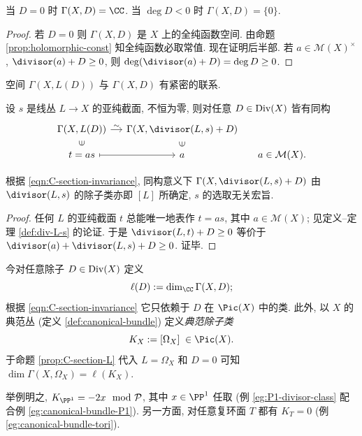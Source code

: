 \begin{lemma}\label{prop:low-degree-vanishing}
	当 $D=0$ 时 $\Gamma(X,D) = \CC$. 当 $\deg D < 0$ 时 $\Gamma(X,D) = \{0\}$.
\end{lemma}
\begin{proof}
	若 $D=0$ 则 $\Gamma(X,D)$ 是 $X$ 上的全纯函数空间. 由命题 \ref{prop:holomorphic-const} 知全纯函数必取常值.	现在证明后半部. 若 $a \in \mathcal{M}(X)^\times$, $\divisor(a) + D \geq 0$, 则 $\deg(\divisor(a) + D) = \deg D \geq 0$.
\end{proof}

空间 $\Gamma(X, L(D))$ 与 $\Gamma(X, D)$ 有紧密的联系.
\begin{proposition}\label{prop:C-section-L}
	设 $s$ 是线丛 $ L \to X$ 的亚纯截面, 不恒为零, 则对任意 $D \in \operatorname{Div}(X)$ 皆有同构
	\[\begin{tikzcd}[row sep=small, column sep=small]
		\Gamma(X, L(D)) \arrow[r, "\sim"] & \Gamma(X, \divisor(L,s) + D) & \\
		t = as \arrow[mapsto, r] \arrow[phantom, u, "\in" sloped] & a \arrow[phantom, u, "\in" sloped] & a \in \mathcal{M}(X).
	\end{tikzcd}\]
\end{proposition}

根据 \eqref{eqn:C-section-invariance}, 同构意义下 $\Gamma(X, \divisor(L,s) + D)$ 由 $\divisor(L,s)$ 的除子类亦即 $[L]$ 所确定, $s$ 的选取无关宏旨.
\begin{proof}
	任何 $L$ 的亚纯截面 $t$ 总能唯一地表作 $t=as$, 其中 $a \in \mathcal{M}(X)$; 见定义--定理 \ref{def:div-L-s} 的论证. 于是 $\divisor(L,t)+D \geq 0$ 等价于 $\divisor(a) + \divisor(L,s) + D \geq 0$. 证毕.
\end{proof}

\begin{definition} 
	 
	今对任意除子 $D \in \operatorname{Div}(X)$ 定义
	\[ \ell(D) := \dim_{\CC} \Gamma(X, D); \]
	根据 \eqref{eqn:C-section-invariance} 它只依赖于 $D$ 在 $\Pic(X)$ 中的类. 此外, 以 $X$ 的典范丛 (定义 \ref{def:canonical-bundle}) 定义\emph{典范除子类}
	\[ K_X := [\Omega_X] \; \in \Pic(X). \]
	于命题 \ref{prop:C-section-L} 代入 $L = \Omega_X$ 和 $D=0$ 可知 $\dim \Gamma(X, \Omega_X) = \ell(K_X)$.
\end{definition}
举例明之, $K_{\PP^1} = -2x \mod \mathcal{P}$, 其中 $x \in \PP^1$ 任取 (例 \ref{eg:P1-divisor-class} 配合例 \ref{eg:canonical-bundle-P1}). 另一方面, 对任意复环面 $T$ 都有 $K_T = 0$ (例 \ref{eg:canonical-bundle-tori}).

